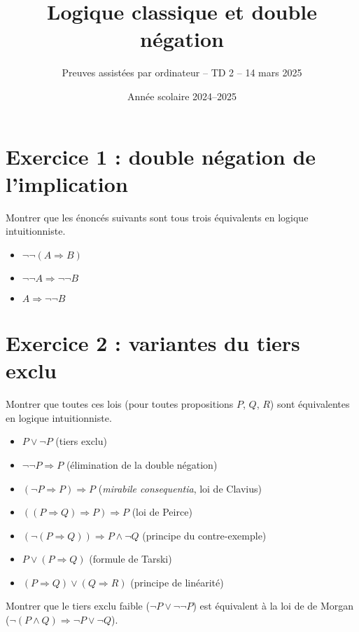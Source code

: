 \documentclass{article}
\begin{document}
\title{Logique classique et double négation}
\author{Preuves assistées par ordinateur -- TD 2 -- 14 mars 2025}
\date{Année scolaire 2024--2025}
\maketitle

\section*{Exercice 1 : double négation de l'implication}
Montrer que les énoncés suivants sont tous trois équivalents en logique intuitionniste.

\begin{itemize}
\item \(\neg\neg (A \Rightarrow B)\)
\item \(\neg \neg A \Rightarrow \neg \neg B\)
\item \(A \Rightarrow \neg \neg B\)
\end{itemize}

\section*{Exercice 2 : variantes du tiers exclu}

Montrer que toutes ces lois (pour toutes propositions \(P\), \(Q\), \(R\)) sont équivalentes en logique intuitionniste.

\begin{itemize}
\item \(P \vee \neg P\) (tiers exclu)
\item \(\neg \neg P \Rightarrow P\) (élimination de la double négation)
\item \((\neg P \Rightarrow P) \Rightarrow P\) (\emph{mirabile consequentia}, loi de Clavius)
\item \(((P \Rightarrow Q) \Rightarrow P) \Rightarrow P\) (loi de Peirce)
\item \((\neg (P \Rightarrow Q)) \Rightarrow P \wedge \neg Q\) (principe du contre-exemple)
\item \(P \vee (P \Rightarrow Q)\) (formule de Tarski)
\item \((P \Rightarrow Q) \vee (Q \Rightarrow R)\) (principe de linéarité)
\end{itemize}

Montrer que le tiers exclu faible (\(\neg P \vee \neg \neg P\)) est équivalent à la loi de de Morgan (\(\neg (P \wedge Q) \Rightarrow \neg P \vee \neg Q\)).
\end{document}
